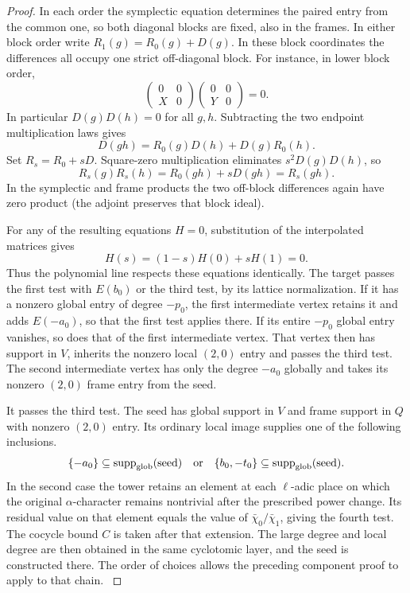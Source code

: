 \begin{proof}
In each order the symplectic equation determines the paired entry from the common one, so both diagonal blocks are fixed, also in the frames. In either block order write \(R_1(g)=R_0(g)+D(g)\).
In these block coordinates the differences all occupy one strict off-diagonal block. For instance, in lower block order,
\[
 \begin{pmatrix}0&0\\ X&0\end{pmatrix}
 \begin{pmatrix}0&0\\ Y&0\end{pmatrix}=0 .
\]
In particular \(D(g)D(h)=0\) for all \(g,h\). Subtracting the two endpoint multiplication laws gives
\[
 D(gh)=R_0(g)D(h)+D(g)R_0(h).
\]
Set \(R_s=R_0+sD\). Square-zero multiplication eliminates
\(s^2 D(g)D(h)\), so
\[
                R_s(g)R_s(h)=R_0(gh)+sD(gh)=R_s(gh).
\]
In the symplectic and frame products the two off-block differences again have zero product (the adjoint preserves that block ideal).

For any of the resulting equations \(H=0\), substitution of the interpolated matrices gives
\[
 H(s)=(1-s)H(0)+sH(1)=0 .
\]
Thus the polynomial line respects these equations identically. The target passes the first test with
\(E(b_0)\) or the third test, by its lattice normalization.
If it has a nonzero global entry of degree \(-p_0\), the
first intermediate vertex retains it and adds \(E(-a_0)\),
so that the first test applies there. If its entire
\(-p_0\) global entry vanishes, so does that of the
first intermediate vertex. That vertex then has support
in \(V\), inherits the nonzero local \((2,0)\) entry and
passes the third test. The second intermediate vertex has
only the degree \(-a_0\) globally and takes its nonzero
\((2,0)\) frame entry from the seed.

It passes the third
test. The seed has global support in \(V\) and frame support
in \(Q\) with nonzero \((2,0)\) entry. Its ordinary local image supplies one of the following inclusions.
\[
 \{-a_0\}\subseteq\operatorname{supp}_{\rm glob}(\text{seed})
 \quad\text{or}\quad
 \{b_0,-t_0\}\subseteq\operatorname{supp}_{\rm glob}(\text{seed}).
\] In the second case the tower retains an element
at each \(\ell\)-adic place on which the original
\(\alpha\)-character remains nontrivial after the prescribed
power change. Its residual value on that element equals the
value of \(\bar\chi_0/\bar\chi_1\), giving the fourth test.
 The cocycle
bound \(C\) is taken after that extension. The large
degree and local degree are then obtained in the same
cyclotomic layer, and the seed is constructed there.
The order of choices allows the preceding component
proof to apply to that chain.
\label{cor:ordinary-promodularity-12}

\end{proof}

